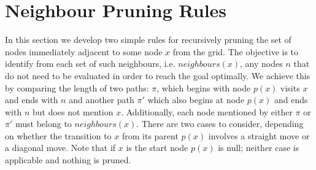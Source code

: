 \section{Neighbour Pruning Rules} 
\label{cha::jps::pruning}

In this section we develop two simple rules for recursively pruning the set of
nodes immediately adjacent to some node $x$ from the grid.  The objective is
to identify from each set of such neighbours, i.e. $neighbours(x)$, any nodes
$n$ that do not need to be evaluated in order to reach the goal optimally. We
achieve this by comparing the length of two paths: $\pi$, which begins with
node $p(x)$ visits $x$ and ends with $n$ and another path $\pi'$ which also
begins at node $p(x)$ and ends with $n$ but does not mention $x$.
Additionally, each node mentioned by either $\pi$ or $\pi'$ must belong to
$neighbours(x)$. There are two cases to consider, depending on
whether the transition to $x$ from its parent $p(x)$ involves a straight move or
a diagonal move. Note that if $x$ is the start node $p(x)$ is null; neither case is
applicable and nothing is pruned.

